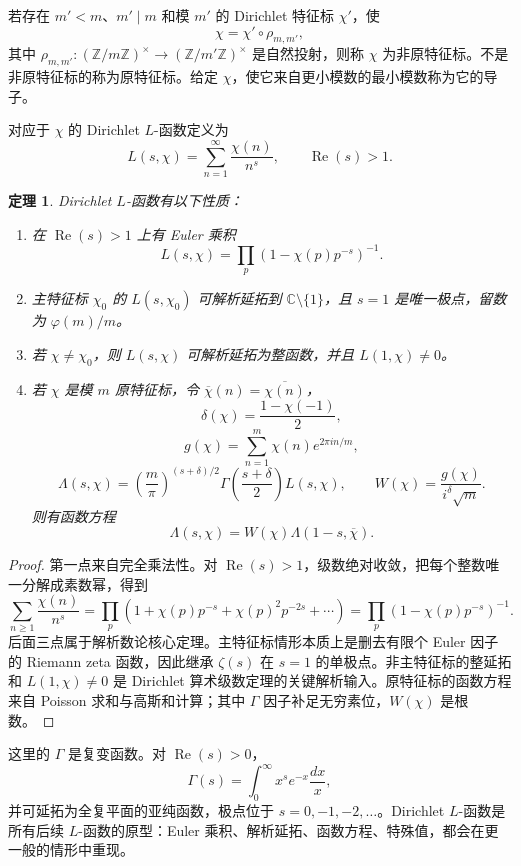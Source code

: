 \documentclass[11pt,a4paper,openany]{ctexbook}
\numberwithin{equation}{chapter}
\newcommand{\C}{\mathbb{C}}
\newcommand{\Z}{\mathbb{Z}}
\theoremstyle{plain}
\newtheorem{theorem}{定理}[chapter]
\theoremstyle{definition}
\theoremstyle{remark}
\begin{document}
若存在 $m'<m$、$m'\mid m$ 和模 $m'$ 的 Dirichlet 特征标 $\chi'$，使
\[
\chi=\chi'\circ\rho_{m,m'},
\]
其中 $\rho_{m,m'}:(\Z/m\Z)^\times\to(\Z/m'\Z)^\times$ 是自然投射，则称 $\chi$ 为非原特征标。不是非原特征标的称为原特征标。给定 $\chi$，使它来自更小模数的最小模数称为它的导子。

对应于 $\chi$ 的 Dirichlet $L$-函数定义为
\[
L(s,\chi)=\sum_{n=1}^\infty\frac{\chi(n)}{n^s},\qquad \operatorname{Re}(s)>1.
\]

\begin{theorem}
Dirichlet $L$-函数有以下性质：
\begin{enumerate}[label=(\arabic*)]
\item 在 $\operatorname{Re}(s)>1$ 上有 Euler 乘积
\[
L(s,\chi)=\prod_p(1-\chi(p)p^{-s})^{-1}.
\]
\item 主特征标 $\chi_0$ 的 $L(s,\chi_0)$ 可解析延拓到 $\C\setminus\{1\}$，且 $s=1$ 是唯一极点，留数为 $\varphi(m)/m$。
\item 若 $\chi\ne\chi_0$，则 $L(s,\chi)$ 可解析延拓为整函数，并且 $L(1,\chi)\ne0$。
\item 若 $\chi$ 是模 $m$ 原特征标，令 $\overline\chi(n)=\overline{\chi(n)}$，
\[
\delta(\chi)=\frac{1-\chi(-1)}2,
\]
\[
g(\chi)=\sum_{n=1}^m\chi(n)e^{2\pi in/m},
\]
\[
\Lambda(s,\chi)=\left(\frac m\pi\right)^{(s+\delta)/2}
\Gamma\left(\frac{s+\delta}{2}\right)L(s,\chi),
\qquad
W(\chi)=\frac{g(\chi)}{i^\delta\sqrt m}.
\]
则有函数方程
\[
\Lambda(s,\chi)=W(\chi)\Lambda(1-s,\overline\chi).
\]
\end{enumerate}
\end{theorem}

\begin{proof}
第一点来自完全乘法性。对 $\operatorname{Re}(s)>1$，级数绝对收敛，把每个整数唯一分解成素数幂，得到
\[
\sum_{n\ge1}\frac{\chi(n)}{n^s}
=\prod_p\left(1+\chi(p)p^{-s}+\chi(p)^2p^{-2s}+\cdots\right)
=\prod_p(1-\chi(p)p^{-s})^{-1}.
\]
后面三点属于解析数论核心定理。主特征标情形本质上是删去有限个 Euler 因子的 Riemann zeta 函数，因此继承 $\zeta(s)$ 在 $s=1$ 的单极点。非主特征标的整延拓和 $L(1,\chi)\ne0$ 是 Dirichlet 算术级数定理的关键解析输入。原特征标的函数方程来自 Poisson 求和与高斯和计算；其中 $\Gamma$ 因子补足无穷素位，$W(\chi)$ 是根数。
\end{proof}

这里的 $\Gamma$ 是复变函数。对 $\operatorname{Re}(s)>0$，
\[
\Gamma(s)=\int_0^\infty x^s e^{-x}\frac{dx}{x},
\]
并可延拓为全复平面的亚纯函数，极点位于 $s=0,-1,-2,\dots$。Dirichlet $L$-函数是所有后续 $L$-函数的原型：Euler 乘积、解析延拓、函数方程、特殊值，都会在更一般的情形中重现。
\end{document}

